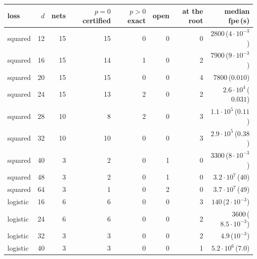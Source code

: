 \begin{tabular}{lrrrrrrr}
\toprule
loss & $d$ & nets & $p=0$ certified & $p>0$ exact & open & at the root & median fpe\,(s)\\
\midrule
squared & 12 & 15 & 15 & 0 & 0 & 0 & $2800$\,($4\cdot10^{-3}$)\\
squared & 16 & 15 & 14 & 1 & 0 & 2 & $7900$\,($9\cdot10^{-3}$)\\
squared & 20 & 15 & 15 & 0 & 0 & 4 & $7800$\,($0.010$)\\
squared & 24 & 15 & 13 & 2 & 0 & 2 & $2.6\cdot10^{4}$\,($0.031$)\\
squared & 28 & 10 & 8 & 2 & 0 & 3 & $1.1\cdot10^{5}$\,($0.11$)\\
squared & 32 & 10 & 10 & 0 & 0 & 3 & $2.9\cdot10^{5}$\,($0.38$)\\
squared & 40 & 3 & 2 & 0 & 1 & 0 & $3300$\,($8\cdot10^{-3}$)\\
squared & 48 & 3 & 2 & 0 & 1 & 0 & $3.2\cdot10^{7}$\,($40$)\\
squared & 64 & 3 & 1 & 0 & 2 & 0 & $3.7\cdot10^{7}$\,($49$)\\
logistic & 16 & 6 & 6 & 0 & 0 & 3 & $140$\,($2\cdot10^{-3}$)\\
logistic & 24 & 6 & 6 & 0 & 0 & 2 & $3600$\,($8.5\cdot10^{-3}$)\\
logistic & 32 & 3 & 3 & 0 & 0 & 2 & $4.9$\,($10^{-3}$)\\
logistic & 40 & 3 & 3 & 0 & 0 & 1 & $5.2\cdot10^{6}$\,($7.0$)\\
\bottomrule
\end{tabular}
